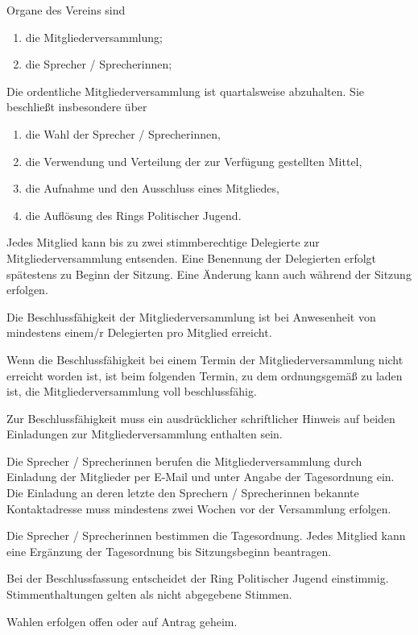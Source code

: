 \documentclass[10pt,a4paper,oneside,parskip=half]{scrartcl}
\begin{document}
\begin{contract}
Organe des Vereins sind
\begin{enumerate}
\item die Mitgliederversammlung;
\item die Sprecher / Sprecherinnen;
\end{enumerate}

Die ordentliche Mitgliederversammlung ist quartalsweise abzuhalten. Sie beschließt insbesondere über %
\begin{enumerate}
\item die Wahl der Sprecher / Sprecherinnen,
\item die Verwendung und Verteilung der zur Verfügung gestellten Mittel,
\item die Aufnahme und den Ausschluss eines Mitgliedes,
\item die Auflösung des Rings Politischer Jugend.
\end{enumerate}

Jedes Mitglied kann bis zu zwei stimmberechtige Delegierte zur Mitgliederversammlung entsenden. Eine Benennung der Delegierten erfolgt spätestens zu Beginn der Sitzung. Eine Änderung kann auch während der Sitzung erfolgen.

Die Beschlussfähigkeit der Mitgliederversammlung ist bei Anwesenheit von mindestens einem/r Delegierten pro Mitglied erreicht.

Wenn die Beschlussfähigkeit bei einem Termin der Mitgliederversammlung nicht erreicht worden ist, ist beim folgenden Termin, zu dem ordnungsgemäß zu laden ist, die Mitgliederversammlung voll beschlussfähig.

Zur Beschlussfähigkeit muss ein ausdrücklicher schriftlicher Hinweis auf beiden Einladungen zur Mitgliederversammlung enthalten sein.

Die Sprecher / Sprecherinnen berufen die Mitgliederversammlung durch Einladung der Mitglieder per E-Mail und unter Angabe der Tagesordnung ein. Die Einladung an deren letzte den Sprechern / Sprecherinnen bekannte Kontaktadresse muss mindestens zwei Wochen vor der Versammlung erfolgen.

Die Sprecher / Sprecherinnen bestimmen die Tagesordnung. Jedes Mitglied kann eine Ergänzung der Tagesordnung bis Sitzungsbeginn beantragen.

Bei der Beschlussfassung entscheidet der Ring Politischer Jugend einstimmig. Stimmenthaltungen gelten als nicht abgegebene Stimmen.

Wahlen erfolgen offen oder auf Antrag geheim.


\end{contract}
\end{document}
